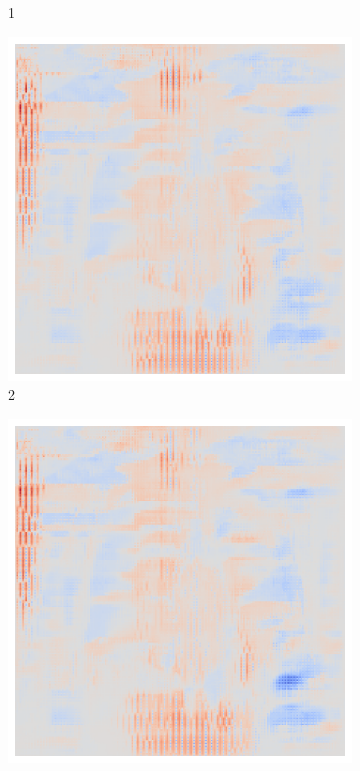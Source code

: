\begin{figure}[ht!]
\begin{subfigure}{0.095\linewidth}
        \caption{1}
    \end{subfigure}\hfill%
    \begin{subfigure}{0.095\linewidth}
        \centering
        \includegraphics[height=1\linewidth]{01-images/05-resultate/uap_efficientnet/uap0-efficientnetv2m-covid-n200-robustificationslevel2.png}
        \caption{2}
    \end{subfigure}\hfill%
    \begin{subfigure}{0.095\linewidth}
        \centering
        \includegraphics[height=1\linewidth]{01-images/05-resultate/uap_efficientnet/uap0-efficientnetv2m-covid-n200-robustificationslevel3.png}

\end{subfigure}
\end{figure}
